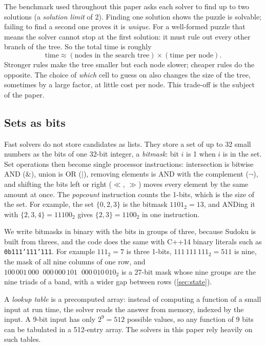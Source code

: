 \documentclass[11pt]{article}
\theoremstyle{definition}
\theoremstyle{plain}
\begin{document}
The benchmark used throughout this paper asks each solver to find up to two solutions (a \emph{solution limit} of 2).
Finding one solution shows the puzzle is solvable; failing to find a second one proves it is \emph{unique}. For a
well-formed puzzle that means the solver cannot stop at the first solution: it must rule out every other branch of the
tree. So the total time is roughly
\[
\text{time} \approx (\text{nodes in the search tree}) \times (\text{time per node}).
\]
Stronger rules make the tree smaller but each node slower; cheaper rules do the opposite. The choice of \emph{which}
cell to guess on also changes the size of the tree, sometimes by a large factor, at little cost per node. This
trade-off is the subject of the paper.

\subsection{Sets as bits}

Fast solvers do not store candidates as lists. They store a set of up to 32 small numbers as the bits of one 32-bit
integer, a \emph{bitmask}: bit $i$ is 1 when $i$ is in the set. Set operations then become single processor
instructions: intersection is bitwise AND ($\&$), union is OR ($\mid$), removing elements is AND with the complement
($\lnot$), and shifting the bits left or right ($\ll$, $\gg$) moves every element by the same amount at once. The
\emph{popcount} instruction counts the 1-bits, which is the size of the set. For example, the set $\{0, 2, 3\}$ is the
bitmask $1101_2 = 13$, and ANDing it with $\{2,3,4\} = 11100_2$ gives $\{2,3\} = 1100_2$ in one instruction.

We write bitmasks in binary with the bits in groups of three, because Sudoku is built from threes, and the code
does the same with C++14 binary literals such as \texttt{0b111'111'111}. For example $111_2 = 7$ is three 1-bits,
$111\,111\,111_2 = 511$ is nine, the mask of all nine columns of one row, and
$100\,001\,000\;\;000\,000\,101\;\;000\,010\,010_2$ is a 27-bit mask whose nine groups are the nine triads of a band, with a wider gap
between rows (\cref{sec:state}).

A \emph{lookup table} is a precomputed array: instead of computing a function of a small input at run time, the solver
reads the answer from memory, indexed by the input. A 9-bit input has only $2^9 = 512$ possible values, so any function
of 9 bits can be tabulated in a 512-entry array. The solvers in this paper rely heavily on such tables.
\end{document}
